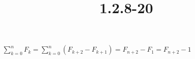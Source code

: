 \documentclass{article}
\title{1.2.8-20}
\begin{document}
\maketitle

\( \sum_{k=0}^n F_k = \sum_{k=0}^n(F_{k+2}-F_{k+1}) = F_{n+2}-F_1 = F_{n+2} - 1 \)
\end{document}
